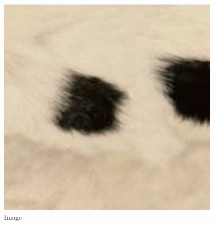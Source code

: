 \documentclass{article}
\begin{document}
    \begin{figure}[!htb]
    \minipage{\textwidth}
    \begin{center}
        \includegraphics[scale=.25]{5/report/steerable/6.png}
      \caption{Image}
    \end{center}
    \endminipage \hfill
    \end{figure}
\end{document}
